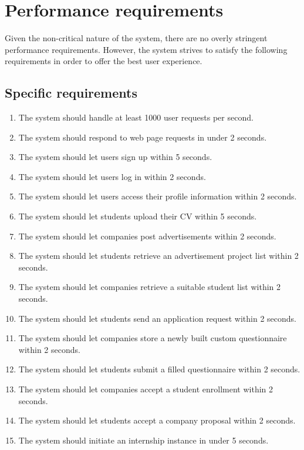 \section{Performance requirements}

Given the non-critical nature of the system, there are no overly stringent performance requirements.
However, the system strives to satisfy the following requirements in order to offer the best user experience.

\subsection{Specific requirements}

\begin{enumerate}[label=\textbf{SR\arabic* -}]
    \item The system should handle at least 1000 user requests per second.
    \item The system should respond to web page requests in under 2 seconds.
    \item The system should let users sign up within 5 seconds.
    \item The system should let users log in within 2 seconds.
    \item The system should let users access their profile information within 2 seconds.
    \item The system should let students upload their CV within 5 seconds.
    \item The system should let companies post advertisements within 2 seconds.
    \item The system should let students retrieve an advertisement project list within 2 seconds.
    \item The system should let companies retrieve a suitable student list within 2 seconds.
    \item The system should let students send an application request within 2 seconds.
    \item The system should let companies store a newly built custom questionnaire within 2 seconds.
    \item The system should let students submit a filled questionnaire within 2 seconds.
    \item The system should let companies accept a student enrollment within 2 seconds.
    \item The system should let students accept a company proposal within 2 seconds.
    \item The system should initiate an internship instance in under 5 seconds.

\end{enumerate}
